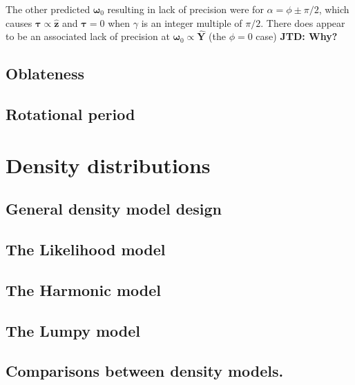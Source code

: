 \documentclass[fleqn,usenatbib]{mnras}
\newcommand{\jtd}[1]{ {\bf{\color{red} JTD: #1}} }
\newcommand{\unit}[1]{\bm{\hat{#1}}}
\begin{document}
The other predicted $\bm \omega_0$ resulting in lack of precision were for $\alpha = \phi \pm \pi/2$, which causes $\bm \tau \propto \unit z$ and $\bm \tau = 0$ when $\gamma$ is an integer multiple of $\pi/2$. There does appear to be an associated lack of precision at $\bm \omega_0 \propto \unit Y$ (the $\phi=0$ case) \jtd{Why?}



\subsection{Oblateness}
\label{sec:scan-oblateness}



\subsection{Rotational period}
\label{sec:scan-period}





\section{Density distributions}
\label{sec:distros}




\subsection{General density model design}




\subsection{The Likelihood model}




\subsection{The Harmonic model}




\subsection{The Lumpy model}




\subsection{Comparisons between density models.}
\end{document}
